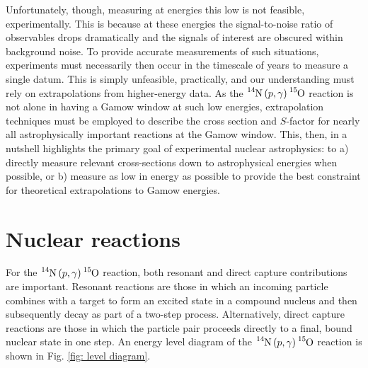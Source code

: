 Unfortunately, though, measuring at energies this low is not feasible, experimentally. This is because at these energies the signal-to-noise ratio of observables drops dramatically and the signals of interest are obscured within background noise. To provide accurate measurements of such situations, experiments must necessarily then occur in the timescale of years to measure a single datum. This is simply unfeasible, practically, and our understanding must rely on extrapolations from higher-energy data. As the $\ce{^{14}N} \left( p, \gamma \right) \ce{^{15}O}$ reaction is not alone in having a Gamow window at such low energies, extrapolation techniques must be employed to describe the cross section and $S$-factor for nearly all astrophysically important reactions at the Gamow window. This, then, in a nutshell highlights the primary goal of experimental nuclear astrophysics: to a) directly measure relevant cross-sections down to astrophysical energies when possible, or b) measure as low in energy as possible to provide the best constraint for theoretical extrapolations to Gamow energies.



\section{Nuclear reactions}
\label{sec: reactions}

For the $\ce{^{14}N} \left( p, \gamma \right) \ce{^{15}O}$ reaction, both resonant and direct capture contributions are important. Resonant reactions are those in which an incoming particle combines with a target to form an excited state in a compound nucleus and then subsequently decay as part of a two-step process. Alternatively, direct capture reactions are those in which the particle pair proceeds directly to a final, bound nuclear state in one step. An energy level diagram of the $\ce{^{14}N} \left( p, \gamma \right) \ce{^{15}O}$ reaction is shown in Fig. \ref{fig: level diagram}.

